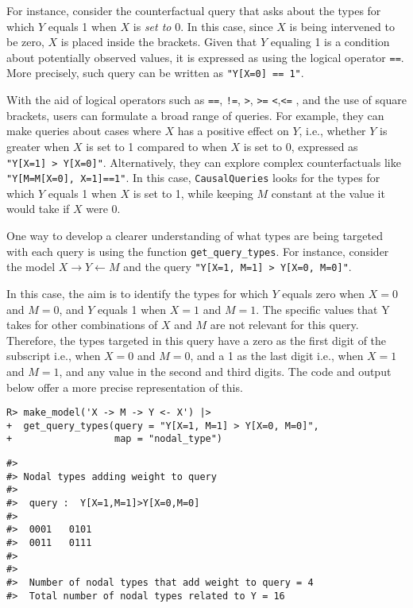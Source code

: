 \documentclass[
  11pt,
  article]{jss}
\begin{document}
For instance, consider the counterfactual query that asks about the
types for which \(Y\) equals 1 when \(X\) is \emph{set to} 0. In this
case, since \(X\) is being intervened to be zero, \(X\) is placed inside
the brackets. Given that \(Y\) equaling 1 is a condition about
potentially observed values, it is expressed as using the logical
operator \texttt{==}. More precisely, such query can be written as
\texttt{"Y{[}X=0{]}\ ==\ 1"}.

With the aid of logical operators such as \texttt{==}, \texttt{!=},
\texttt{\textgreater{}}, \texttt{\textgreater{}=}
\texttt{\textless{}},\texttt{\textless{}=} , and the use of square
brackets, users can formulate a broad range of queries. For example,
they can make queries about cases where \(X\) has a positive effect on
\(Y\), i.e., whether \(Y\) is greater when \(X\) is set to 1 compared to
when \(X\) is set to 0, expressed as
\texttt{"Y{[}X=1{]}\ \textgreater{}\ Y{[}X=0{]}"}. Alternatively, they
can explore complex counterfactuals like
\texttt{"Y{[}M=M{[}X=0{]},\ X=1{]}==1"}. In this case,
\texttt{CausalQueries} looks for the types for which \(Y\) equals 1 when
\(X\) is set to 1, while keeping \(M\) constant at the value it would
take if \(X\) were 0.

One way to develop a clearer understanding of what types are being
targeted with each query is using the function
\texttt{get\_query\_types}. For instance, consider the model
\(X \rightarrow Y \leftarrow M\) and the query
\texttt{"Y{[}X=1,\ M=1{]}\ \textgreater{}\ Y{[}X=0,\ M=0{]}"}.

In this case, the aim is to identify the types for which \(Y\) equals
zero when \(X = 0\) and \(M = 0\), and \(Y\) equals 1 when \(X = 1\) and
\(M = 1\). The specific values that Y takes for other combinations of
\(X\) and \(M\) are not relevant for this query. Therefore, the types
targeted in this query have a zero as the first digit of the subscript
i.e., when \(X = 0\) and \(M = 0\), and a 1 as the last digit i.e., when
\(X = 1\) and \(M = 1\), and any value in the second and third digits.
The code and output below offer a more precise representation of this.

\begin{verbatim}
R> make_model('X -> M -> Y <- X') |> 
+  get_query_types(query = "Y[X=1, M=1] > Y[X=0, M=0]", 
+                  map = "nodal_type")
\end{verbatim}

\begin{verbatim}
#> 
#> Nodal types adding weight to query
#> 
#>  query :  Y[X=1,M=1]>Y[X=0,M=0] 
#> 
#>  0001   0101
#>  0011   0111
#> 
#> 
#>  Number of nodal types that add weight to query = 4
#>  Total number of nodal types related to Y = 16
\end{verbatim}
\end{document}
